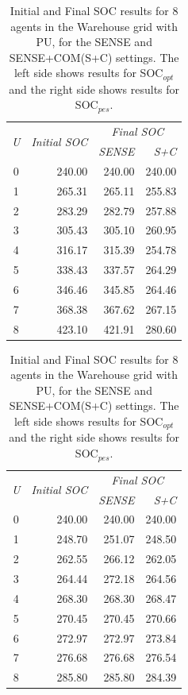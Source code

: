 \documentclass[jair,twoside,11pt,theapa]{article}
\newcommand{\sense}{SENSE\xspace}
\newcommand{\sensecom}{SENSE+COM\xspace}
\newcommand{\socopt}{SOC$_{opt}$\xspace}
\newcommand{\socpes}{SOC$_{pes}$\xspace}
\begin{document}
\begin{table}
\parbox{.5\linewidth}{
\centering
\begin{tabular}{crrr}
\hline
\multirow{2}{*}{\textit{U}} & \multirow{2}{*}{\textit{Initial SOC}} & \multicolumn{2}{c}{\textit{Final SOC}} \\ \cline{3-4} 
 &  & \textit{\sense} & \textit{S+C} \\ \hline
0 & 240.00 & 240.00 & 240.00 \\
1 & 265.31 & 265.11 & 255.83 \\
2 & 283.29 & 282.79 & 257.88 \\
3 & 305.43 & 305.10 & 260.95 \\
4 & 316.17 & 315.39 & 254.78 \\
5 & 338.43 & 337.57 & 264.29 \\
6 & 346.46 & 345.85 & 264.46 \\
7 & 368.38 & 367.62 & 267.15 \\
8 & 423.10 & 421.91 & 280.60 \\ \hline
\end{tabular}
}
\hfill
\parbox{.5\linewidth}{
\centering
\begin{tabular}{crrr}
\hline
\multirow{2}{*}{\textit{U}} & \multirow{2}{*}{\textit{Initial SOC}} & \multicolumn{2}{c}{\textit{Final SOC}} \\ \cline{3-4} 
 &  & \textit{\sense} & \textit{S+C} \\ \hline
0 & 240.00 & 240.00 & 240.00 \\
1 & 248.70 & 251.07 & 248.50 \\
2 & 262.55 & 266.12 & 262.05 \\
3 & 264.44 & 272.18 & 264.56 \\
4 & 268.30 & 268.30 & 268.47 \\
5 & 270.45 & 270.45 & 270.66 \\
6 & 272.97 & 272.97 & 273.84 \\
7 & 276.68 & 276.68 & 276.54 \\
8 & 285.80 & 285.80 & 284.39 \\ \hline
\end{tabular}
}
\caption{Initial and Final SOC results for 8 agents in the Warehouse grid with PU, for the \sense and \sensecom (S+C) settings. 
The left side shows results for \socopt and the right side shows results for \socpes.}
\label{tab:warehouse-absolute-online}
\end{table}
\end{document}
